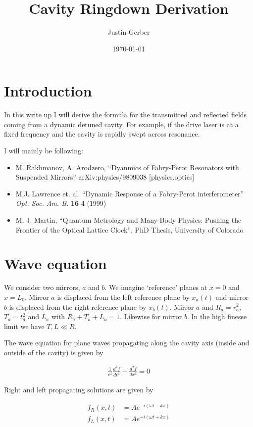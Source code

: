 \documentclass[12pt]{article}
\begin{document}
\title{Cavity Ringdown Derivation}
\author{Justin Gerber}
\date{\today}
\maketitle

\section{Introduction}

In this write up I will derive the formula for the transmitted and reflected fields coming from a dynamic detuned cavity. 
For example, if the drive laser is at a fixed frequency and the cavity is rapidly swept across resonance.

I will mainly be following:
\begin{itemize}
\item{M. Rakhmanov, A. Arodzero, ``Dyanmics of Fabry-Perot Resonators with Suspended Mirrors'' arXiv:physics/9809038 [physics.optics]}
\item{M.J. Lawrence et. al. ``Dynamic Response of a Fabry-Perot interferometer'' \textit{Opt. Soc. Am. B.} \textbf{16} 4 (1999)}
\item{M. J. Martin, ``Quantum Metrology and Many-Body Physics: Pushing the Frontier of the Optical Lattice Clock'', PhD Thesis, University of Colorado}
\end{itemize}

\section{Wave equation}

We consider two mirrors, $a$ and $b$. We imagine `reference' planes at $x=0$ and $x=L_0$. 
Mirror $a$ is displaced from the left reference plane by $x_a(t)$ and mirror $b$ is displaced from the right reference plane by $x_b(t)$.
Mirror $a$ and $R_a = r_a^2$, $T_a=t_a^2$ and $L_a$ with $R_a+T_a+L_a = 1$.
Likewise for mirror $b$. 
In the high finesse limit we have $T, L \ll R$.

The wave equation for plane waves propagating along the cavity axis (inside and outside of the cavity) is given by

\begin{align}
\frac{1}{c^2}\frac{d^2f}{dt^2} - \frac{d^2f}{dx^2} = 0
\end{align}

Right and left propagating solutions are given by

\begin{align}
f_R(x, t) &= A e^{-i(\omega t - kx)}\\
f_L(x, t) &= A e^{-i(\omega t + kx)}\\
\end{align}
\end{document}
